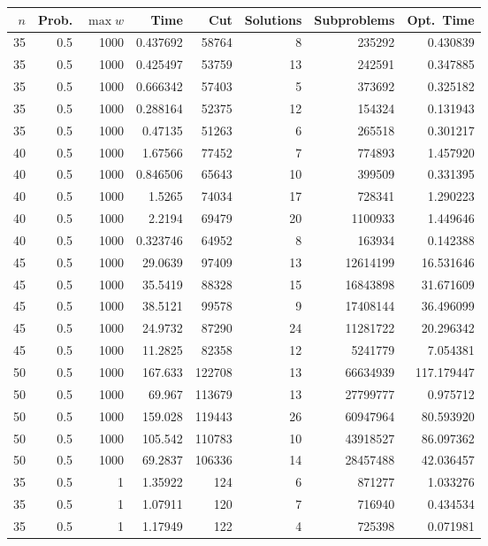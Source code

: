 \documentclass[a4paper,11pt]{article}
\begin{document}
\begin{table}
\begin{center}
\begin{tabular}{|rrr|r|r|rr|r|}
\hline
$n$ & Prob. & $\max w$ & Time & Cut & Solutions & Subproblems & Opt.\ Time \\
\hline
35 & 0.5 & 1000 & 0.437692 & 58764 & 8 & 235292 & 0.430839 \\
35 & 0.5 & 1000 & 0.425497 & 53759 & 13 & 242591 & 0.347885 \\
35 & 0.5 & 1000 & 0.666342 & 57403 & 5 & 373692 & 0.325182 \\
35 & 0.5 & 1000 & 0.288164 & 52375 & 12 & 154324 & 0.131943 \\
35 & 0.5 & 1000 & 0.47135 & 51263 & 6 & 265518 & 0.301217 \\
40 & 0.5 & 1000 & 1.67566 & 77452 & 7 & 774893 & 1.457920 \\
40 & 0.5 & 1000 & 0.846506 & 65643 & 10 & 399509 & 0.331395 \\
40 & 0.5 & 1000 & 1.5265 & 74034 & 17 & 728341 & 1.290223 \\
40 & 0.5 & 1000 & 2.2194 & 69479 & 20 & 1100933 & 1.449646 \\
40 & 0.5 & 1000 & 0.323746 & 64952 & 8 & 163934 & 0.142388 \\
45 & 0.5 & 1000 & 29.0639 & 97409 & 13 & 12614199 & 16.531646 \\
45 & 0.5 & 1000 & 35.5419 & 88328 & 15 & 16843898 & 31.671609 \\
45 & 0.5 & 1000 & 38.5121 & 99578 & 9 & 17408144 & 36.496099 \\
45 & 0.5 & 1000 & 24.9732 & 87290 & 24 & 11281722 & 20.296342 \\
45 & 0.5 & 1000 & 11.2825 & 82358 & 12 & 5241779 & 7.054381 \\
50 & 0.5 & 1000 & 167.633 & 122708 & 13 & 66634939 & 117.179447 \\
50 & 0.5 & 1000 & 69.967 & 113679 & 13 & 27799777 & 0.975712 \\
50 & 0.5 & 1000 & 159.028 & 119443 & 26 & 60947964 & 80.593920 \\
50 & 0.5 & 1000 & 105.542 & 110783 & 10 & 43918527 & 86.097362 \\
50 & 0.5 & 1000 & 69.2837 & 106336 & 14 & 28457488 & 42.036457 \\
\hline
35 & 0.5 & 1 & 1.35922 & 124 & 6 & 871277 & 1.033276 \\
35 & 0.5 & 1 & 1.07911 & 120 & 7 & 716940 & 0.434534 \\
35 & 0.5 & 1 & 1.17949 & 122 & 4 & 725398 & 0.071981 \\

\end{tabular}
\end{center}
\end{table}
\end{document}
